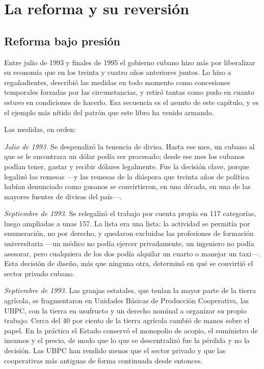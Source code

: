 \chapter{La reforma y su reversión}
\label{ch:dollarreform}

\section{Reforma bajo presión}

Entre julio de 1993 y finales de 1995 el gobierno cubano hizo más por liberalizar
su economía que en los treinta y cuatro años anteriores juntos. Lo hizo a
regañadientes, describió las medidas en todo momento como concesiones temporales
forzadas por las circunstancias, y retiró tantas como pudo en cuanto estuvo en
condiciones de hacerlo. Esa secuencia es el asunto de este capítulo, y es el
ejemplo más nítido del patrón que este libro ha venido armando.

Las medidas, en orden:

\emph{Julio de 1993.} Se despenalizó la tenencia de divisa. Hasta ese mes, un
cubano al que se le encontrara un dólar podía ser procesado; desde ese mes los
cubanos podían tener, gastar y recibir dólares legalmente. Fue la decisión
clave, porque legalizó las remesas ---y las remesas de la diáspora que treinta
años de política habían denunciado como gusanos se convirtieron, en una década, en
una de las mayores fuentes de divisas del país---.

\emph{Septiembre de 1993.} Se relegalizó el trabajo por cuenta propia en 117
categorías, luego ampliadas a unas 157. La lista era una lista: la actividad se
permitía por enumeración, no por derecho, y quedaron excluidas las profesiones de
formación universitaria ---un médico no podía ejercer privadamente, un ingeniero
no podía asesorar, pero cualquiera de los dos podía alquilar un cuarto o manejar
un taxi---. Esta decisión de diseño, más que ninguna otra, determinó en qué se
convirtió el sector privado cubano.

\emph{Septiembre de 1993.} Las granjas estatales, que tenían la mayor parte de la
tierra agrícola, se fragmentaron en Unidades Básicas de Producción Cooperativa,
las UBPC, con la tierra en usufructo y un derecho nominal a organizar su propio
trabajo. Cerca del 40 por ciento de la tierra agrícola cambió de manos sobre el
papel.\unv{} En la práctica el Estado conservó el monopolio de acopio, el
suministro de insumos y el precio, de modo que lo que se descentralizó fue la
pérdida y no la decisión. Las UBPC han rendido menos que el sector privado y que
las cooperativas más antiguas de forma continuada desde entonces.

